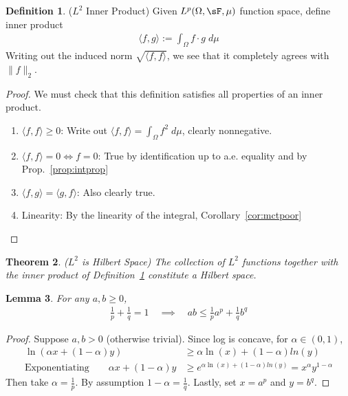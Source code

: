 \documentclass[12pt]{article}
\theoremstyle{plain}
\newtheorem{thm}{Theorem}[section]
\newtheorem{lem}[thm]{Lemma}
\theoremstyle{definition}
\newtheorem{defn}[thm]{Definition}
\theoremstyle{remark}
\begin{document}
\begin{defn}($L^2$ Inner Product)
\label{defn:L2}
Given $L^p(\Omega,\sF,\mu)$ function space, define inner product
\begin{align*}
  \langle f,g \rangle
  := \int_\Omega f\cdot g \; d\mu
\end{align*}
Writing out the induced norm $\sqrt{\langle f,f\rangle}$, we see that it
completely agrees with $\lVert f\rVert_2$.
\end{defn}
\begin{proof}
We must check that this definition satisfies all properties of an inner
product.
\begin{enumerate}[label=(\roman*)]
  \item $\langle f,f \rangle\geq 0$:
    Write out $\langle f,f\rangle = \int_\Omega f^2\;d\mu$,
    clearly nonnegative.
  \item $\langle f,f \rangle= 0 \iff f=0$:
    True by identification up to a.e.  equality and by
    Prop.~\ref{prop:intprop}
  \item $\langle f,g \rangle =\langle g,f \rangle$:
    Also clearly true.
  \item Linearity: By the linearity of the integral,
    Corollary~\ref{cor:mctpoor}
\end{enumerate}
\end{proof}

\begin{thm}\emph{($L^2$ is Hilbert Space)}
The collection of $L^2$ functions together with the inner product of
Definition~\ref{defn:L2} constitute a Hilbert space.
\end{thm}

\begin{lem}
\label{lem:holder}
For any $a,b\geq 0$,
\begin{align*}
  \frac{1}{p}+\frac{1}{q}=1
  \quad\implies\quad
  ab
  \leq
  \frac{1}{p} a^p + \frac{1}{q} b^q
\end{align*}
\end{lem}
\begin{proof}
Suppose $a,b>0$ (otherwise trivial).
Since log is concave, for $\alpha\in(0,1)$,
\begin{align*}
  \ln(\alpha x + (1-\alpha)y)
  &\geq
  \alpha \ln(x) + (1-\alpha)ln(y) \\
  \text{Exponentiating} \qquad
  \alpha x + (1-\alpha)y
  &\geq
  e^{\alpha \ln(x) + (1-\alpha)ln(y)}
  = x^\alpha y^{1-\alpha}
\end{align*}
Then take $\alpha =\frac{1}{p}$. By assumption $1-\alpha=\frac{1}{q}$.
Lastly, set $x=a^p$ and $y=b^q$.
\end{proof}
\end{document}
